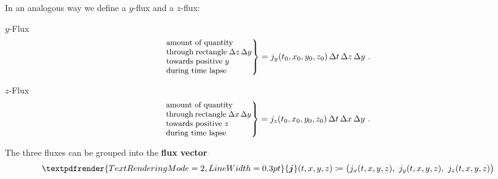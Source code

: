 \documentclass[a4paper,12pt,%
onecolumn,oneside,titlepage,%
british%
]{memoir}
\renewcommand*{\bm}[1]{\textpdfrender{TextRenderingMode=2,LineWidth=0.3pt}{\boldsymbol{#1}}}
\newcommand*{\incr}{\Delta}%
\newcommand*{\defd}{\coloneqq}
\renewcommand*{\|}[1][]{\nonscript\:#1\vert\nonscript\:\mathopen{}}
\newcommand*{\yto}{t_{0}}
\newcommand*{\yxo}{x_{0}}
\newcommand*{\yyo}{y_{0}}
\newcommand*{\yzo}{z_{0}}
\newcommand*{\Dt}{\incr t}
\newcommand*{\Dx}{\incr x}
\newcommand*{\Dy}{\incr y}
\newcommand*{\Dz}{\incr z}
\begin{document}
In an analogous way we define a $y$-flux and a $z$-flux:

\begin{definition}{$y$-Flux}
  \begin{equation}
    \label{eq:yflux_expl}
    \left.\parbox[c]{10em}{\small amount of quantity\\ through rectangle $\Dz\,\Dy$\\ towards positive $y$\\during time lapse }\right\} = 
    j_{y}(\yto,\yxo,\yyo,\yzo)\, \Dt\, \Dz\, \Dy \ .
  \end{equation}
\end{definition}
\begin{definition}{$z$-Flux}
  \begin{equation}
    \label{eq:zflux_expl}
    \left.\parbox[c]{10em}{\small amount of quantity\\ through rectangle $\Dx\,\Dy$\\ towards positive $z$\\during time lapse }\right\} = 
    j_{z}(\yto,\yxo,\yyo,\yzo)\, \Dt\, \Dx\, \Dy \ .
  \end{equation}
\end{definition}

The three fluxes can be grouped into the \textbf{flux vector}
\begin{equation}
  \label{eq:flux_vector}
  \bm{j}(t,x,y,z) \defd
  \bigl(j_{x}(t,x,y,z),\ j_{y}(t,x,y,z),\ j_{z}(t,x,y,z)\bigr)
\end{equation}
\end{document}
